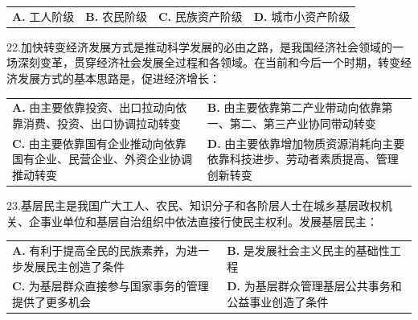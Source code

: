 \documentclass[UTF8,11pt]{ctexart}
\begin{document}
\begin{center}\begin{tabular}{>{\raggedright\arraybackslash}p{\dimexpr(\linewidth-8\tabcolsep)/4\relax}>{\raggedright\arraybackslash}p{\dimexpr(\linewidth-8\tabcolsep)/4\relax}>{\raggedright\arraybackslash}p{\dimexpr(\linewidth-8\tabcolsep)/4\relax}>{\raggedright\arraybackslash}p{\dimexpr(\linewidth-8\tabcolsep)/4\relax}}
\textbf{A.} 工人阶级 & \textbf{B.} 农民阶级 & \textbf{C.} 民族资产阶级 & \textbf{D.} 城市小资产阶级\\[.35em]\end{tabular}\end{center}

22.加快转变经济发展方式是推动科学发展的必由之路，是我国经济社会领域的一场深刻变革，贯穿经济社会发展全过程和各领域。在当前和今后一个时期，转变经济发展方式的基本思路是，促进经济增长：


\begin{center}\begin{tabular}{>{\raggedright\arraybackslash}p{\dimexpr(\linewidth-4\tabcolsep)/2\relax}>{\raggedright\arraybackslash}p{\dimexpr(\linewidth-4\tabcolsep)/2\relax}}
\textbf{A.} 由主要依靠投资、出口拉动向依靠消费、投资、出口协调拉动转变 & \textbf{B.} 由主要依靠第二产业带动向依靠第一、第二、第三产业协同带动转变\\[.35em]
\textbf{C.} 由主要依靠国有企业推动向依靠国有企业、民营企业、外资企业协调推动转变 & \textbf{D.} 由主要依靠增加物质资源消耗向主要依靠科技进步、劳动者素质提高、管理创新转变\\[.35em]\end{tabular}\end{center}

23.基层民主是我国广大工人、农民、知识分子和各阶层人士在城乡基层政权机关、企事业单位和基层自治组织中依法直接行使民主权利。发展基层民主：


\begin{center}\begin{tabular}{>{\raggedright\arraybackslash}p{\dimexpr(\linewidth-4\tabcolsep)/2\relax}>{\raggedright\arraybackslash}p{\dimexpr(\linewidth-4\tabcolsep)/2\relax}}
\textbf{A.} 有利于提高全民的民族素养，为进一步发展民主创造了条件 & \textbf{B.} 是发展社会主义民主的基础性工程\\[.35em]
\textbf{C.} 为基层群众直接参与国家事务的管理提供了更多机会 & \textbf{D.} 为基层群众管理基层公共事务和公益事业创造了条件\\[.35em]\end{tabular}\end{center}
\end{document}
